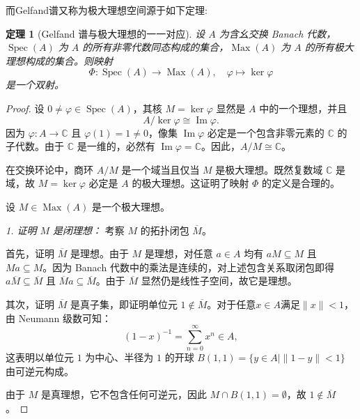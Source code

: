 \documentclass[math-font=lm, text-font=lm, math-style=TeX]{sjtureport}
\newtheorem{theorem}{定理}[chapter]
\theoremstyle{plain}
\newtheorem*{proof}{证明}
\theoremstyle{plain}
\DeclareMathOperator{\Spec}{Spec}
\begin{document}
而Gelfand谱又称为极大理想空间源于如下定理:

\begin{theorem}[Gelfand 谱与极大理想的一一对应]\label{thm:spec-maximal-ideal}
    设 $A$ 为含幺交换 Banach 代数，$\Spec(A)$ 为 $A$ 的所有非零代数同态构成的集合，$\operatorname{Max}(A)$ 为 $A$ 的所有极大理想构成的集合。则映射
    \begin{equation}
        \Phi: \Spec(A) \longrightarrow \operatorname{Max}(A), \quad \varphi \longmapsto \ker\varphi
    \end{equation}
    是一个双射。
\end{theorem}

\begin{proof}
     设 $0\neq \varphi \in \Spec(A)$，其核 $M = \ker\varphi$ 显然是 $A$ 中的一个理想，并且
    \begin{equation*}
        A / \ker\varphi \cong \operatorname{Im}\varphi.
    \end{equation*}
    因为 $\varphi: A \to \mathbb{C}$ 且 $\varphi(1) = 1 \neq 0$，像集 $\operatorname{Im}\varphi$ 必定是一个包含非零元素的 $\mathbb{C}$ 的子代数。由于 $\mathbb{C}$ 是一维的，必然有 $\operatorname{Im}\varphi = \mathbb{C}$。因此，$A / M \cong \mathbb{C}$。\par
    在交换环论中，商环 $A/M$ 是一个域当且仅当 $M$ 是极大理想。既然复数域 $\mathbb{C}$ 是域，故 $M = \ker\varphi$ 必定是 $A$ 的极大理想。这证明了映射 $\Phi$ 的定义是合理的。

     设 $M \in \operatorname{Max}(A)$ 是一个极大理想。\par
    \textit{1. 证明 $M$ 是闭理想：} 
    考察 $M$ 的拓扑闭包 $\overline{M}$。
    
    首先，证明 $\overline{M}$ 是理想。由于 $M$ 是理想，对任意 $a \in A$ 均有 $aM \subseteq M$ 且 $Ma \subseteq M$。因为 Banach 代数中的乘法是连续的，对上述包含关系取闭包即得 $a\overline{M} \subseteq \overline{M}$ 且 $\overline{M}a \subseteq \overline{M}$。由于 $\overline{M}$ 显然仍是线性子空间，故它是理想。
    
    其次，证明 $\overline{M}$ 是真子集，即证明单位元 $1 \notin \overline{M}$。对于任意$x \in A$满足$\|x\| < 1$，由 Neumann 级数可知：
    \begin{equation*}
        (1 - x)^{-1} = \sum_{n=0}^{\infty} x^n \in A,
    \end{equation*}
    这表明以单位元 $1$ 为中心、半径为 $1$ 的开球 $B(1, 1) = \{ y \in A \mid \|1 - y\| < 1 \}$ 由可逆元构成。\par
    由于 $M$ 是真理想，它不包含任何可逆元，因此 $M \cap B(1, 1) = \emptyset$，故 $1\notin \overline{M}$。
    

\end{proof}
\end{document}
